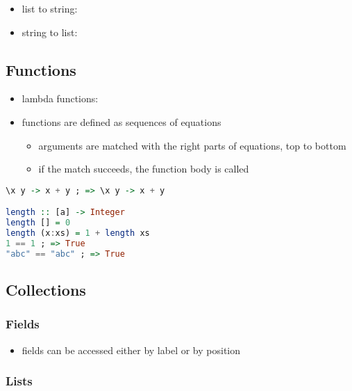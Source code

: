 \documentclass[a4paper,landscape,10pt]{article}
\begin{document}
\begin{multicols*}{2}
  \begin{itemize}
    \item list to string: 
    \item string to list: 
  \end{itemize}

  \subsection{Functions}

  \begin{itemize}
    \item lambda functions: 
    \item functions are defined as sequences of equations
          \begin{itemize}
            \item arguments are matched with the right parts of equations, top to bottom
            \item if the match succeeds, the function body is called
          \end{itemize}
  \end{itemize}

  \begin{lstlisting}[language=Haskell]
\x y -> x + y ; => \x y -> x + y

length :: [a] -> Integer
length [] = 0
length (x:xs) = 1 + length xs
1 == 1 ; => True
"abc" == "abc" ; => True
\end{lstlisting}

  \subsection{Collections}

  \subsubsection{Fields}

  \begin{itemize}
    \item fields can be accessed either by label or by position
  \end{itemize}

  \subsubsection{Lists}


\end{multicols*}
\end{document}
